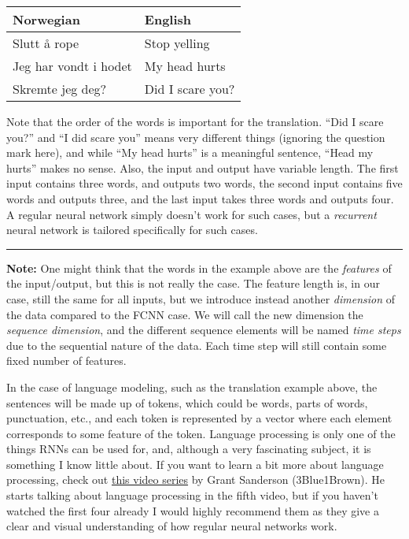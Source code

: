 \documentclass[11pt]{article}
\begin{document}
\begin{longtable}[]{@{}ll@{}}
\toprule\noalign{}
Norwegian & English \\
\midrule\noalign{}
\endhead
\bottomrule\noalign{}
\endlastfoot
Slutt å rope & Stop yelling \\
Jeg har vondt i hodet & My head hurts \\
Skremte jeg deg? & Did I scare you? \\
\end{longtable}

    Note that the order of the words is important for the translation. ``Did
I scare you?'' and ``I did scare you'' means very different things
(ignoring the question mark here), and while ``My head hurts'' is a
meaningful sentence, ``Head my hurts'' makes no sense. Also, the input
and output have variable length. The first input contains three words,
and outputs two words, the second input contains five words and outputs
three, and the last input takes three words and outputs four. A regular
neural network simply doesn't work for such cases, but a
\emph{recurrent} neural network is tailored specifically for such cases.

    \begin{center}\rule{0.5\linewidth}{0.5pt}\end{center}

\textbf{Note:} One might think that the words in the example above are
the \emph{features} of the input/output, but this is not really the
case. The feature length is, in our case, still the same for all inputs,
but we introduce instead another \emph{dimension} of the data compared
to the FCNN case. We will call the new dimension the \emph{sequence
dimension}, and the different sequence elements will be named \emph{time
steps} due to the sequential nature of the data. Each time step will
still contain some fixed number of features.

In the case of language modeling, such as the translation example above,
the sentences will be made up of tokens, which could be words, parts of
words, punctuation, etc., and each token is represented by a vector
where each element corresponds to some feature of the token. Language
processing is only one of the things RNNs can be used for, and, although
a very fascinating subject, it is something I know little about. If you
want to learn a bit more about language processing, check out
\href{https://www.youtube.com/playlist?list=PLZHQObOWTQDNU6R1_67000Dx_ZCJB-3pi}{this
video series} by Grant Sanderson (3Blue1Brown). He starts talking about
language processing in the fifth video, but if you haven't watched the
first four already I would highly recommend them as they give a clear
and visual understanding of how regular neural networks work.
\end{document}
